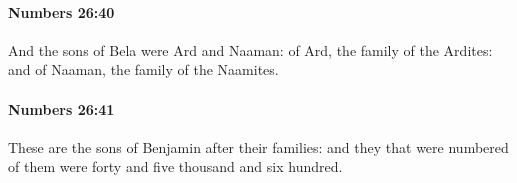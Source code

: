 		\paragraph{Numbers 26:40} %
			\label{NUMBERS-26-40}

			And the sons of Bela were Ard and Naaman: of Ard, the family of the Ardites: and of Naaman, the family of the Naamites.


		\paragraph{Numbers 26:41} %
			\label{NUMBERS-26-41}

			These are the sons of Benjamin after their families: and they that were numbered of them were forty and five thousand and six hundred.


